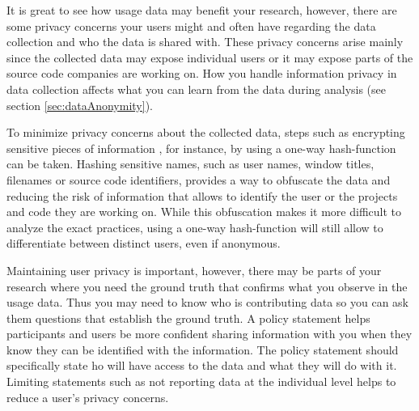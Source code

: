 It is great to see how usage data may benefit your research, however, there are some privacy concerns your users might and often have regarding the data collection and who the data is shared with. These privacy concerns arise mainly since the collected data may expose individual users or it may expose parts of the source code companies are working on.  How you handle information privacy in data collection affects what you can learn from the data during analysis (see section \ref{sec:dataAnonymity}).


To minimize privacy concerns about the collected data, steps such as encrypting sensitive pieces of information , for instance, by using a one-way hash-function can be taken. Hashing sensitive names, such as user names, window titles, filenames or source code identifiers, provides a way to obfuscate the data and reducing the risk of information that allows to identify the user or the projects and code they are working on. While this obfuscation makes it more difficult to analyze the exact practices, using a one-way hash-function will still allow to differentiate between distinct users, even if anonymous.


Maintaining user privacy is important, however, there may be parts of your research where you need the ground truth that confirms what you observe in the usage data.  Thus you may need to know who is contributing data so you can ask them questions that establish the ground truth. A policy statement helps participants and users be more confident sharing information with you when they know they can be identified with the information.  The policy statement should specifically state ho will have access to the data and what they will do with it. Limiting statements such as not reporting data at the individual level helps to reduce a user's privacy concerns.

